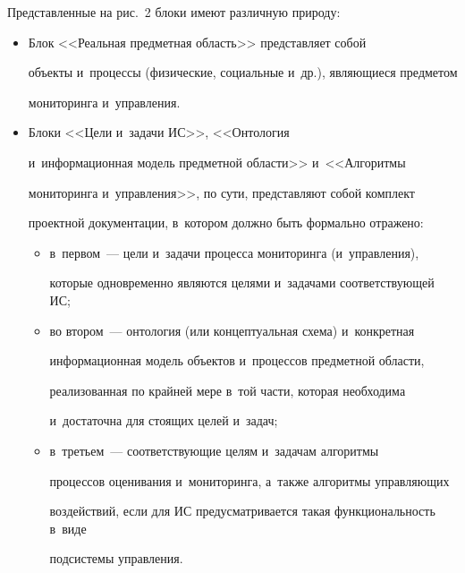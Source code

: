      


     Представленные на рис.~2 блоки имеют различную природу:


     \begin{itemize}


     \item[А.] Блок <<Реальная предметная область>> представляет собой 


объекты и~процессы (физические, социальные и~др.), являющиеся предметом 


мониторинга и~управления.\\[-15pt]


     \item[Б.] Блоки <<Цели и~задачи ИС>>, <<Онтология 


и~информационная модель предметной области>> и~<<Алгоритмы 


мониторинга и~управления>>, по сути, представляют собой комплект 


проектной документации, в~котором должно быть формально отражено:\\[-15pt]


     \begin{itemize}


     \item в~первом~--- цели и~задачи процесса мониторинга (и~управления), 


которые одновременно являются целями и~задачами соответствующей ИС;\\[-15pt]


     \item во втором~--- онтология (или концептуальная схема) и~конкретная 


информационная модель объектов и~процессов предметной области, 


реализованная по крайней мере в~той части, которая необходима 


и~достаточна для стоящих целей и~задач;\\[-15pt]


     \item в~третьем~--- соответствующие целям и~задачам алгоритмы 


процессов оценивания и~мониторинга, а~также алгоритмы управляющих 


воздействий, если для ИС предусматривается такая функциональность в~виде 


подсистемы управления.\\[-15pt]


     \end{itemize}



\end{itemize}
